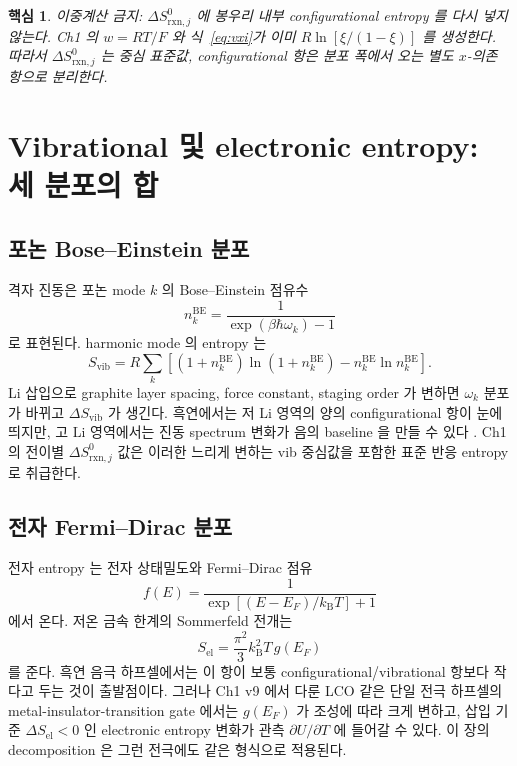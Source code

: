 \documentclass[11pt,a4paper]{article}
\newtheorem*{keybox}{핵심}
\newcommand{\rxn}{\mathrm{rxn}}
\newcommand{\vib}{\mathrm{vib}}
\newcommand{\el}{\mathrm{el}}
\newcommand{\BE}{\mathrm{BE}}
\newcommand{\kB}{k_\mathrm{B}}
\begin{document}
\begin{keybox}
이중계산 금지: $\Delta S^0_{\rxn,j}$ 에 봉우리 내부 configurational entropy 를
다시 넣지 않는다. Ch1 의 $w=RT/F$ 와 식~\eqref{eq:vxi}가 이미
$R\ln[\xi/(1-\xi)]$ 를 생성한다. 따라서 $\Delta S^0_{\rxn,j}$ 는 중심 표준값,
configurational 항은 분포 폭에서 오는 별도 $x$-의존 항으로 분리한다.
\end{keybox}

\section{Vibrational 및 electronic entropy: 세 분포의 합}
\label{sec:vib_el}
\subsection{포논 Bose--Einstein 분포}
격자 진동은 포논 mode $k$ 의 Bose--Einstein 점유수
\begin{equation}
n_k^{\BE}=\frac{1}{\exp(\beta\hbar\omega_k)-1}
\label{eq:be}
\end{equation}
로 표현된다. harmonic mode 의 entropy 는
\begin{equation}
S_\vib
=R\sum_k\left[(1+n_k^{\BE})\ln(1+n_k^{\BE})
 -n_k^{\BE}\ln n_k^{\BE}\right].
\label{eq:svib}
\end{equation}
Li 삽입으로 graphite layer spacing, force constant, staging order 가 변하면
$\omega_k$ 분포가 바뀌고 $\Delta S_\vib$ 가 생긴다. 흑연에서는 저 Li 영역의
양의 configurational 항이 눈에 띄지만, 고 Li 영역에서는 진동 spectrum 변화가
음의 baseline 을 만들 수 있다 \cite{reynier2003,allart2018,jpcc2021}. Ch1 의
전이별 $\Delta S^0_{\rxn,j}$ 값은 이러한 느리게 변하는 vib 중심값을 포함한
표준 반응 entropy 로 취급한다.

\subsection{전자 Fermi--Dirac 분포}
전자 entropy 는 전자 상태밀도와 Fermi--Dirac 점유
\begin{equation}
f(E)=\frac{1}{\exp[(E-E_F)/\kB T]+1}
\label{eq:fd}
\end{equation}
에서 온다. 저온 금속 한계의 Sommerfeld 전개는
\begin{equation}
S_\el=\frac{\pi^2}{3}\kB^2T\,g(E_F)
\label{eq:sel}
\end{equation}
를 준다. 흑연 음극 하프셀에서는 이 항이 보통 configurational/vibrational 항보다
작다고 두는 것이 출발점이다. 그러나 Ch1 v9 에서 다룬 LCO 같은 단일 전극 하프셀의
metal-insulator-transition gate 에서는 $g(E_F)$ 가 조성에 따라 크게 변하고,
삽입 기준 $\Delta S_\el<0$ 인 electronic entropy 변화가 관측 $\partial U/\partial T$ 에
들어갈 수 있다. 이 장의 decomposition 은 그런 전극에도 같은 형식으로 적용된다.
\end{document}
